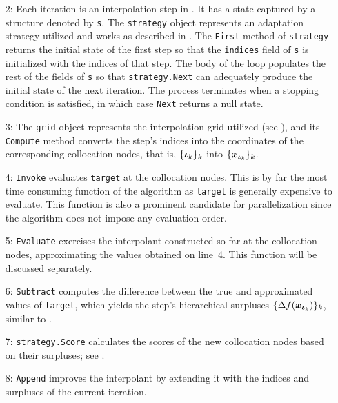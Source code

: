 \begin{itemize}

\item[2:] Each iteration is an interpolation step in . It
has a state captured by a structure denoted by \texttt{s}. The \texttt{strategy}
object represents an adaptation strategy utilized and works as described in
. The \texttt{First} method of \texttt{strategy} returns the
initial state of the first step so that the \texttt{indices} field of \texttt{s}
is initialized with the indices of that step. The body of the loop populates the
rest of the fields of \texttt{s} so that \texttt{strategy.Next} can adequately
produce the initial state of the next iteration. The process terminates when a
stopping condition is satisfied, in which case \texttt{Next} returns a null
state.

\item[3:] The \texttt{grid} object represents the interpolation grid utilized
(see ), and its \texttt{Compute} method converts the step's indices
into the coordinates of the corresponding collocation nodes, that is, $\{
\boldsymbol{\iota}_k \}_k$ into $\{ \boldsymbol{x}_{\boldsymbol{\iota}_k} \}_k$.

\item[4:] \texttt{Invoke} evaluates \texttt{target} at the collocation nodes.
This is by far the most time consuming function of the algorithm as
\texttt{target} is generally expensive to evaluate. This function is also a
prominent candidate for parallelization since the algorithm does not impose any
evaluation order.

\item[5:] \texttt{Evaluate} exercises the interpolant constructed so far at the
collocation nodes, approximating the values obtained on line~4. This function
will be discussed separately.

\item[6:] \texttt{Subtract} computes the difference between the true and
approximated values of \texttt{target}, which yields the step's hierarchical
surpluses $\{ \Delta f(\boldsymbol{x}_{\boldsymbol{\iota}_k}) \}_k$, similar to .

\item[7:] \texttt{strategy.Score} calculates the scores of the new collocation
nodes based on their surpluses; see .

\item[8:] \texttt{Append} improves the interpolant by extending it with the
indices and surpluses of the current iteration.

\end{itemize}

